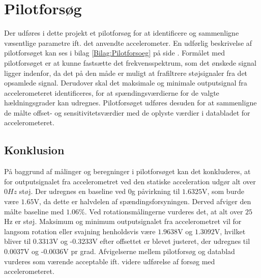 \section{Pilotforsøg}\label{Sec:PilotforsoegKort}
Der udføres i dette projekt et pilotforsøg for at identificere og sammenligne væsentlige parametre ift. det anvendte accelerometer. En udførlig beskrivelse af pilotforsøget kan ses i bilag \ref{Bilag:Pilotforsoeg} på side \pageref{Bilag:Pilotforsoeg}.
Formålet med pilotforsøget er at kunne fastsætte det frekvensspektrum, som det ønskede signal ligger indenfor, da det på den måde er muligt at frafiltrere støjsignaler fra det opsamlede signal. Derudover skal det maksimale og minimale outputsignal fra accelerometeret identificeres, for at spændingsværdierne for de valgte hældningsgrader kan udregnes. Pilotforsøget udføres desuden for at sammenligne de målte offset- og sensitivitetsværdier med de oplyste værdier i databladet for accelerometeret. 
\subsection{Konklusion}
På baggrund af målinger og beregninger i pilotforsøget kan det konkluderes, at for outputsignalet fra accelerometret ved den statiske acceleration udgør alt over $0Hz$ støj. Der udregnes en baseline ved $0$g påvirkning til $1.6325$V, som burde være $1.65$V, da dette er halvdelen af spændingsforsyningen. Derved afviger den målte baseline med $1.06$\%. Ved rotationsmålingerne vurderes det, at alt over $25$Hz er støj. Maksimum og minimum outputsignalet fra accelerometret vil for langsom rotation eller svajning henholdsvis være $1.9638$V og $1.3092$V, hvilket bliver til $0.3313$V og -$0.3233$V efter offsettet er blevet justeret, der udregnes til $0.0037$V og -$0.0036$V pr grad. Afvigelserne mellem pilotforsøg og datablad vurderes som værende acceptable ift. videre udførelse af forsøg med accelerometeret. 

